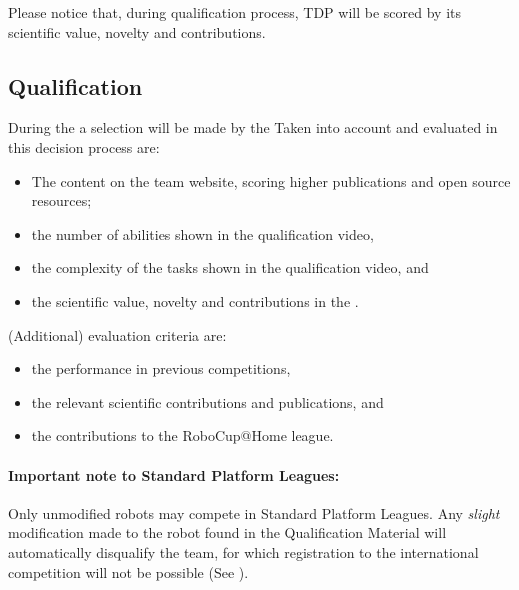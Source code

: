 Please notice that, during qualification process, TDP will be scored by its scientific value, novelty and contributions.


\subsection{Qualification}
\label{rule:qualification}

During the  a selection will be made by the  Taken into account and evaluated in this decision process are:
\begin{itemize}
	\item The content on the team website, scoring higher publications and open source resources;
	\item the number of abilities shown in the qualification video,
	\item the complexity of the tasks shown in the qualification video, and
	\item the scientific value, novelty and contributions in the . %
\end{itemize}
(Additional) evaluation criteria are: 
\begin{itemize}
	\item the performance in previous competitions, 
	\item the relevant scientific contributions and publications, and
	\item the contributions to the RoboCup@Home league.
\end{itemize}

\paragraph{Important note to Standard Platform Leagues:} Only unmodified robots may compete in Standard Platform Leagues. Any \textit{slight} modification made to the robot found in the Qualification Material will automatically disqualify the team, for which registration to the international competition will not be possible  (See ).



